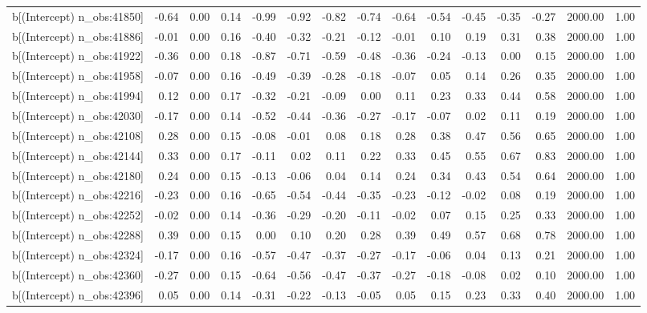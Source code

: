 \begin{table}[ht]
\begin{tabular}{rrrrrrrrrrrrrrr}
  b[(Intercept) n\_obs:41850] & -0.64 & 0.00 & 0.14 & -0.99 & -0.92 & -0.82 & -0.74 & -0.64 & -0.54 & -0.45 & -0.35 & -0.27 & 2000.00 & 1.00 \\ 
  b[(Intercept) n\_obs:41886] & -0.01 & 0.00 & 0.16 & -0.40 & -0.32 & -0.21 & -0.12 & -0.01 & 0.10 & 0.19 & 0.31 & 0.38 & 2000.00 & 1.00 \\ 
  b[(Intercept) n\_obs:41922] & -0.36 & 0.00 & 0.18 & -0.87 & -0.71 & -0.59 & -0.48 & -0.36 & -0.24 & -0.13 & 0.00 & 0.15 & 2000.00 & 1.00 \\ 
  b[(Intercept) n\_obs:41958] & -0.07 & 0.00 & 0.16 & -0.49 & -0.39 & -0.28 & -0.18 & -0.07 & 0.05 & 0.14 & 0.26 & 0.35 & 2000.00 & 1.00 \\ 
  b[(Intercept) n\_obs:41994] & 0.12 & 0.00 & 0.17 & -0.32 & -0.21 & -0.09 & 0.00 & 0.11 & 0.23 & 0.33 & 0.44 & 0.58 & 2000.00 & 1.00 \\ 
  b[(Intercept) n\_obs:42030] & -0.17 & 0.00 & 0.14 & -0.52 & -0.44 & -0.36 & -0.27 & -0.17 & -0.07 & 0.02 & 0.11 & 0.19 & 2000.00 & 1.00 \\ 
  b[(Intercept) n\_obs:42108] & 0.28 & 0.00 & 0.15 & -0.08 & -0.01 & 0.08 & 0.18 & 0.28 & 0.38 & 0.47 & 0.56 & 0.65 & 2000.00 & 1.00 \\ 
  b[(Intercept) n\_obs:42144] & 0.33 & 0.00 & 0.17 & -0.11 & 0.02 & 0.11 & 0.22 & 0.33 & 0.45 & 0.55 & 0.67 & 0.83 & 2000.00 & 1.00 \\ 
  b[(Intercept) n\_obs:42180] & 0.24 & 0.00 & 0.15 & -0.13 & -0.06 & 0.04 & 0.14 & 0.24 & 0.34 & 0.43 & 0.54 & 0.64 & 2000.00 & 1.00 \\ 
  b[(Intercept) n\_obs:42216] & -0.23 & 0.00 & 0.16 & -0.65 & -0.54 & -0.44 & -0.35 & -0.23 & -0.12 & -0.02 & 0.08 & 0.19 & 2000.00 & 1.00 \\ 
  b[(Intercept) n\_obs:42252] & -0.02 & 0.00 & 0.14 & -0.36 & -0.29 & -0.20 & -0.11 & -0.02 & 0.07 & 0.15 & 0.25 & 0.33 & 2000.00 & 1.00 \\ 
  b[(Intercept) n\_obs:42288] & 0.39 & 0.00 & 0.15 & 0.00 & 0.10 & 0.20 & 0.28 & 0.39 & 0.49 & 0.57 & 0.68 & 0.78 & 2000.00 & 1.00 \\ 
  b[(Intercept) n\_obs:42324] & -0.17 & 0.00 & 0.16 & -0.57 & -0.47 & -0.37 & -0.27 & -0.17 & -0.06 & 0.04 & 0.13 & 0.21 & 2000.00 & 1.00 \\ 
  b[(Intercept) n\_obs:42360] & -0.27 & 0.00 & 0.15 & -0.64 & -0.56 & -0.47 & -0.37 & -0.27 & -0.18 & -0.08 & 0.02 & 0.10 & 2000.00 & 1.00 \\ 
  b[(Intercept) n\_obs:42396] & 0.05 & 0.00 & 0.14 & -0.31 & -0.22 & -0.13 & -0.05 & 0.05 & 0.15 & 0.23 & 0.33 & 0.40 & 2000.00 & 1.00 \\ 

\end{tabular}
\end{table}
